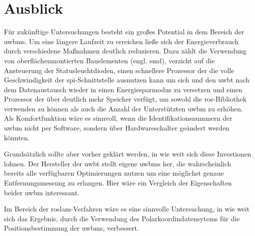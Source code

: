 %
%
\section{Ausblick}

Für zukünftige Untersuchungen besteht ein großes Potential in dem Bereich der \glspl{uwbm}. Um eine längere Laufzeit zu erreichen ließe sich der Energieverbrauch durch verschiedene Maßnahmen deutlich reduzieren. Dazu zählt die Verwendung von oberflächenmontierten Bauelementen (engl. \gls{smd}), verzicht auf die Ansteuerung der Statusleuchtdioden, einen schnellere Prozessor der die volle Geschwindigkeit der \gls{spi}-Schnittstelle ausnutzen kann um sich und den \gls{uwbt} nach dem Datenaustausch wieder in einen Energiesparmodus zu versetzen und einen Prozessor der über deutlich mehr Speicher verfügt, um sowohl die \gls{ros}-Bibliothek verwenden zu können als auch die Anzahl der Unterstützten \gls{uwbm} zu erhöhen. Als Komfortfunktion wäre es sinnvoll, wenn die Identifikationsnummern der \gls{uwbm} nicht per Software, sondern über Hardwareschalter geändert werden könnten.

Grundsätzlich sollte aber vorher geklärt werden, in wie weit sich diese Investionen lohnen. Der Hersteller der \gls{uwbt} stellt eigene \glspl{uwbm} her, die wahrscheinlich bereits alle verfügbaren Optimierungen nutzen um eine möglichst genaue Entfernungsmessung zu erlangen. Hier wäre ein Vergleich der Eigenschaften beider \gls{uwbm} interessant.

Im Bereich der \gls{roslam}-Verfahren wäre es eine sinnvolle Untersuchung, in wie weit sich das Ergebnis, durch die Verwendung des Polarkoordindatensytems für die Positionsbestimmung der \glspl{uwbm}, verbessert.


